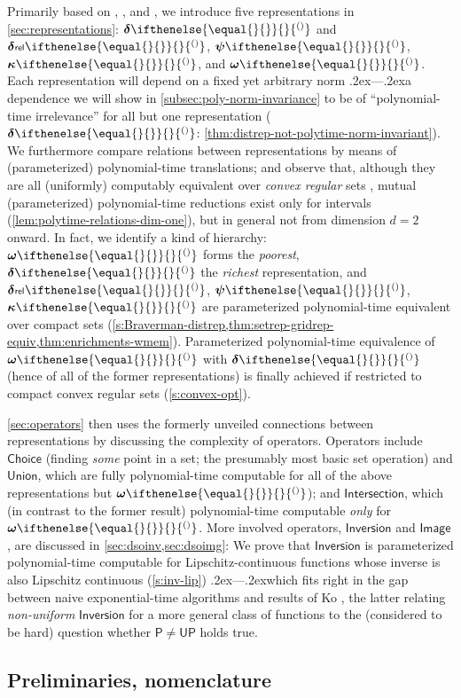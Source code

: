 \documentclass{CSML}
\newcommand{\representation}[2]{ #1\ifnotempty{#2}{^{(#2)}} }
\newcommand{\PTime}{\mathsf{P}}
\newcommand{\UPTime}{\mathsf{UP}}
\newcommand{\distrep}[1][\empty]{ \representation{\bm{\delta}}{#1} }
\newcommand{\reldistrep}[1][\empty]{ \representation{%
	\bm{\delta}\kern.05ex{\scriptstyle\mathsf{rel}}\kern.1ex%
	}{#1} }
\newcommand{\setrep}[1][\empty]{ \representation{\bm{\psi}}{#1} }
\newcommand{\gridrep}[1][\empty]{ \representation{\bm{\kappa}}{#1} }
\newcommand{\wmemrep}[1][\empty]{ \representation{\bm{\omega}}{#1} }
\newcommand{\ifnotempty}[2]{ \ifthenelse{ \equal{#1}{\empty} }{}{#2} }
\newcommand{\secref}[1]{\S{#1}}
\newcommand{\dsoch}{\mathsf{Choice}}
\newcommand{\dsocap}{\mathsf{Intersection}}
\newcommand{\dsocup}{\mathsf{Union}}
\newcommand{\dsoinv}{\mathsf{Inversion}}
\newcommand{\dsoimg}{\mathsf{Image}}
\newcommand{\emdash}{\leavevmode\unskip\kern.2ex---\kern.2ex\ignorespaces}
\begin{document}
Primarily based on \cite[Chap.~4]{GLS88}, \cite[\secref{5}]{Weih00},
\cite{Ziegler02} and \cite{RettingerHabil}, we introduce five representations
in \cref{sec:representations}: $\distrep$ and $\reldistrep$, $\setrep$,
$\gridrep$, and $\wmemrep$. Each representation will depend on a fixed yet
arbitrary norm \emdash a dependence we will show in
\cref{subsec:poly-norm-invariance} to be of ``polynomial-time irrelevance''
for all but one representation ($\distrep$:
\cref{thm:distrep-not-polytime-norm-invariant}). We furthermore compare
relations between representations by means of (parameterized) polynomial-time
translations; and observe that, although they are all (uniformly)
computably equivalent over \emph{convex regular} sets
\cite[Cor.~4.13]{Ziegler02}, mutual (parameterized) polynomial-time reductions exist
only for intervals (\cref{lem:polytime-relations-dim-one}), but in general not from
dimension $d = 2$ onward.
In fact, we identify a kind of hierarchy:
$\wmemrep$ forms the \emph{poorest}, $\distrep$ the \emph{richest}
representation, and $\reldistrep$, $\setrep$, $\gridrep$ are parameterized
polynomial-time equivalent over compact sets
(\cref{s:Braverman-distrep,thm:setrep-gridrep-equiv,thm:enrichments-wmem}).
Parameterized polynomial-time equivalence of $\wmemrep$ with $\distrep$
(hence of all of the former representations) is finally achieved if
restricted to compact convex regular sets (\cref{s:convex-opt}).

\cref{sec:operators} then uses the formerly unveiled connections between
representations by discussing the complexity of operators. Operators include
$\dsoch$ (finding \emph{some} point in a set; the presumably most basic set
operation) and $\dsocup$, which are fully polynomial-time computable
for all of the above representations but $\wmemrep$); and $\dsocap$, which
(in contrast to the former result) polynomial-time computable \emph{only} for $\wmemrep$.
More involved operators, $\dsoinv$ and $\dsoimg$, are discussed in
\cref{sec:dsoinv,sec:dsoimg}: We prove that $\dsoinv$ is parameterized
polynomial-time computable for Lipschitz-continuous functions whose inverse
is also Lipschitz continuous (\cref{s:inv-lip}) \emdash which
fits right in the gap between naive exponential-time algorithms and results
of Ko \cite[Thm.~4.23+4.26]{Ko91}, the latter relating \emph{non-uniform}
$\dsoinv$ for a more general class of functions to the (considered to be hard)
question whether $\PTime \neq \UPTime$ holds true.


\subsection*{Preliminaries, nomenclature}
\end{document}
